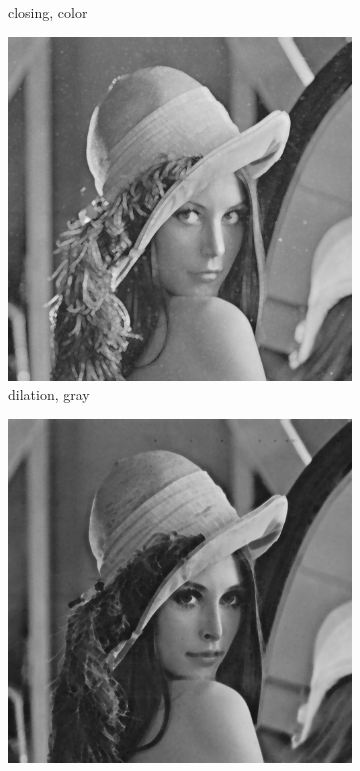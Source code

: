\begin{figure}[!ht]
\begin{subfigure}[t]{0.22\textwidth}
    \caption{closing, color}
    \centering
  \end{subfigure}
\begin{subfigure}[t]{0.22\textwidth}
    \includegraphics[width=0.9\linewidth]{../project/images/outputs/compare_gray/dilation_gray.png}
    \caption{dilation, gray}
    \centering
  \end{subfigure}
\begin{subfigure}[t]{0.22\textwidth}
    \includegraphics[width=0.9\linewidth]{../project/images/outputs/compare_gray/erosion_gray.png}

\end{subfigure}
\end{figure}
